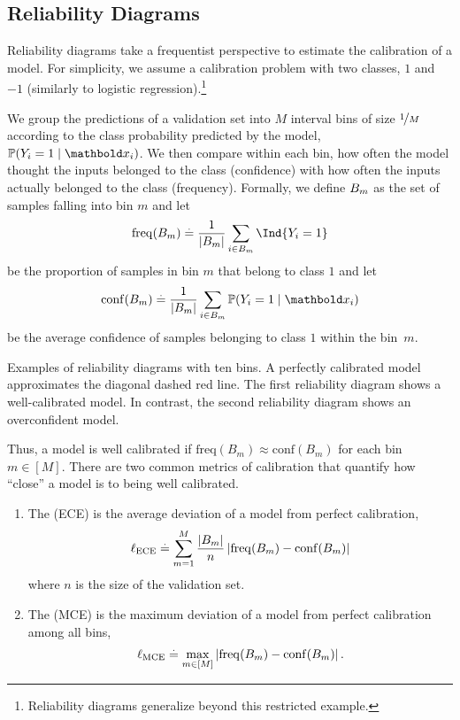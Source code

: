 \subsection{Reliability Diagrams}

Reliability diagrams take a frequentist perspective to estimate the calibration of a model.
For simplicity, we assume a calibration problem with two classes, $1$ and $-1$ (similarly to logistic regression).\footnote{Reliability diagrams generalize beyond this restricted example.}

We group the predictions of a validation set into $M$ interval bins of size $\nicefrac{1}{M}$ according to the class probability predicted by the model, $\Pr{Y_i = 1 \mid \vx_i}$.
We then compare within each bin, how often the model thought the inputs belonged to the class (confidence) with how often the inputs actually belonged to the class (frequency).
Formally, we define $B_m$ as the set of samples falling into bin $m$ and let \begin{align}
  \mathrm{freq}(\sB_m) \defeq \frac{1}{\card{\sB_m}} \sum_{i \in \sB_m} \Ind{Y_i = 1}
\end{align} be the proportion of samples in bin $m$ that belong to class $1$ and let \begin{align}
  \mathrm{conf}(\sB_m) \defeq \frac{1}{\card{\sB_m}} \sum_{i \in \sB_m} \Pr{Y_i = 1 \mid \vx_i}
\end{align} be the average confidence of samples belonging to class $1$ within the bin~$m$.

\begin{marginfigure}
  \caption{Examples of reliability diagrams with ten bins.
  A perfectly calibrated model approximates the diagonal dashed red line.
  The first reliability diagram shows a well-calibrated model.
  In contrast, the second reliability diagram shows an overconfident model.}\label{fig:reliability_diagram}
\end{marginfigure}

Thus, a model is well calibrated if $\mathrm{freq}(B_m) \approx \mathrm{conf}(B_m)$ for each bin $m \in [M]$.
There are two common metrics of calibration that quantify how ``close'' a model is to being well calibrated.

\begin{enumerate}
  \item The  (ECE) is the average deviation of a model from perfect calibration, \begin{align}
    \ell_{\mathrm{ECE}} \overset{.}{=} \sum_{m=1}^M \frac{\left| B_m \right|}{n} \left| \mathrm{freq}(B_m) - \mathrm{conf}(B_m) \right|
  \end{align} where $n$ is the size of the validation set.

  \item The  (MCE) is the maximum deviation of a model from perfect calibration among all bins, \begin{align}
    \ell_{\mathrm{MCE}} \overset{.}{=} \max_{m \in [M]} \left| \mathrm{freq}(B_m) - \mathrm{conf}(B_m) \right|.
  \end{align}
\end{enumerate}

